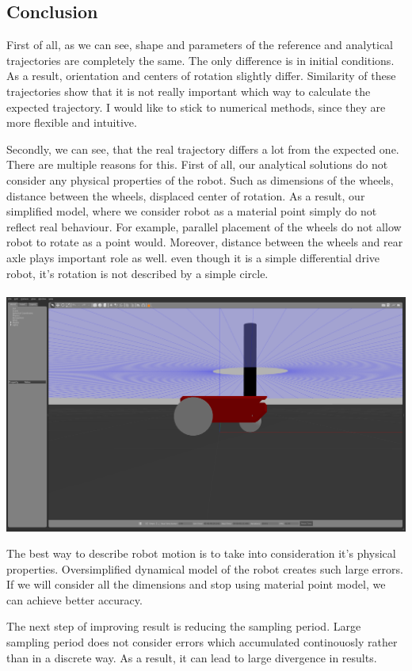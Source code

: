 \documentclass{article}
\begin{document}
\subsection*{Conclusion}

First of all, as we can see, shape and parameters of the reference and analytical trajectories are completely the same.
The only difference is in initial conditions. As a result, orientation and centers of rotation slightly differ.
Similarity of these trajectories show that it is not really important which way to calculate the expected
trajectory. I would like to stick to numerical methods, since they are more flexible and intuitive.

Secondly, we can see, that the real trajectory differs a lot from the expected one. 
There are multiple reasons for this.
First of all, our analytical solutions do not consider any physical properties of the robot.
Such as dimensions of the wheels, distance between the wheels, displaced center of rotation. As a result,
our simplified model, where we consider robot as a material point simply do not reflect real behaviour.
For example, parallel placement of the wheels do not allow robot to rotate as a point would.
Moreover, distance between the wheels and rear axle plays important role as well.
even though it is a simple differential drive robot, it's rotation is not described by a simple circle.
\\\\
\includegraphics[scale=0.18]{assets/robot.png}

The best way to describe robot motion is to take into consideration it's physical properties. Oversimplified
dynamical model of the robot creates such large errors. If we will consider all the dimensions and stop using
material point model, we can achieve better accuracy.

The next step of improving result is reducing the sampling period. Large sampling period does not
consider errors which accumulated continouosly rather than in a discrete way. As a result, it can
lead to large divergence in results.
\end{document}
